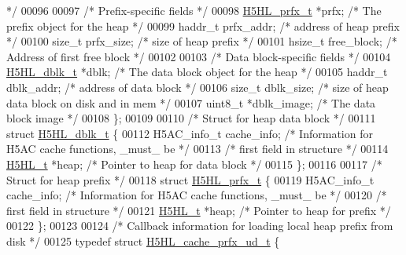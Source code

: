\begin{DoxyCode}
{              */}
00096 
00097     \textcolor{comment}{/* Prefix-specific fields */}
00098     \hyperlink{struct_h5_h_l__prfx__t}{H5HL\_prfx\_t}     *prfx;              \textcolor{comment}{/* The prefix object for the heap                       
      */}
00099     haddr\_t         prfx\_addr;          \textcolor{comment}{/* address of heap prefix                               */}
00100     \textcolor{keywordtype}{size\_t}          prfx\_size;          \textcolor{comment}{/* size of heap prefix                                  */}
00101     hsize\_t         free\_block;         \textcolor{comment}{/* Address of first free block                          */}
00102 
00103     \textcolor{comment}{/* Data block-specific fields */}
00104     \hyperlink{struct_h5_h_l__dblk__t}{H5HL\_dblk\_t}     *dblk;              \textcolor{comment}{/* The data block object for the heap                   
      */}
00105     haddr\_t         dblk\_addr;          \textcolor{comment}{/* address of data block                                */}
00106     \textcolor{keywordtype}{size\_t}          dblk\_size;          \textcolor{comment}{/* size of heap data block on disk and in mem           */}
00107     uint8\_t         *dblk\_image;        \textcolor{comment}{/* The data block image                                 */}
00108 \};
00109 
00110 \textcolor{comment}{/* Struct for heap data block */}
00111 \textcolor{keyword}{struct }\hyperlink{struct_h5_h_l__dblk__t}{H5HL\_dblk\_t} \{
00112     H5AC\_info\_t     cache\_info;         \textcolor{comment}{/* Information for H5AC cache functions, \_must\_ be      */}
00113                                         \textcolor{comment}{/* first field in structure                             */}
00114     \hyperlink{struct_h5_h_l__t}{H5HL\_t}          *heap;              \textcolor{comment}{/* Pointer to heap for data block                       */}
00115 \};
00116 
00117 \textcolor{comment}{/* Struct for heap prefix */}
00118 \textcolor{keyword}{struct }\hyperlink{struct_h5_h_l__prfx__t}{H5HL\_prfx\_t} \{
00119     H5AC\_info\_t     cache\_info;         \textcolor{comment}{/* Information for H5AC cache functions, \_must\_ be      */}
00120                                         \textcolor{comment}{/* first field in structure                             */}
00121     \hyperlink{struct_h5_h_l__t}{H5HL\_t}          *heap;              \textcolor{comment}{/* Pointer to heap for prefix                           */}
00122 \};
00123 
00124 \textcolor{comment}{/* Callback information for loading local heap prefix from disk */}
00125 \textcolor{keyword}{typedef} \textcolor{keyword}{struct }\hyperlink{struct_h5_h_l__cache__prfx__ud__t}{H5HL\_cache\_prfx\_ud\_t} \{

\end{DoxyCode}
